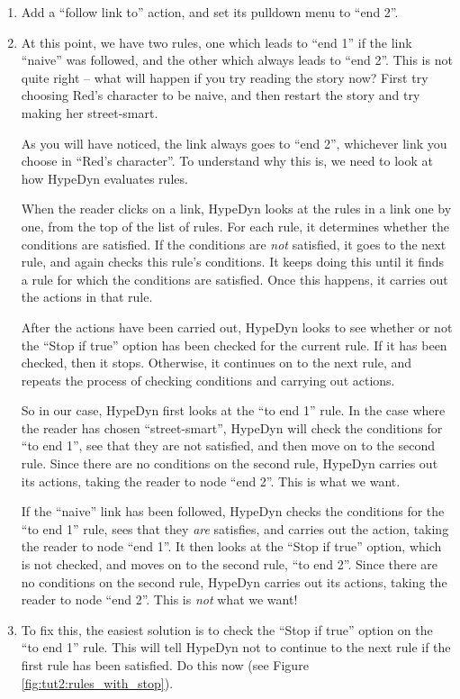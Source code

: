 \documentclass{article}
\begin{document}
\begin{enumerate}
\item Add a ``follow link to'' action, and set its pulldown menu to ``end 2''.

\item At this point, we have two rules, one which leads to ``end 1'' if the link ``naive'' was followed, and the other which always leads to ``end 2''. This is not quite right -- what will happen if you try reading the story now? First try choosing Red's character to be naive, and then restart the story and try making her street-smart.

As you will have noticed, the link always goes to ``end 2'', whichever link you choose in ``Red's character''. To understand why this is, we need to look at how HypeDyn evaluates rules.

When the reader clicks on a link, HypeDyn looks at the rules in a link one by one, from the top of the list of rules. For each rule, it determines whether the conditions are satisfied. If the conditions are \textit{not} satisfied, it goes to the next rule, and again checks this rule's conditions. It keeps doing this until it finds a rule for which the conditions are satisfied. Once this happens, it carries out the actions in that rule.

After the actions have been carried out, HypeDyn looks to see whether or not the ``Stop if true'' option has been checked for the current rule. If it has been checked, then it stops. Otherwise, it continues on to the next rule, and repeats the process of checking conditions and carrying out actions.

So in our case, HypeDyn first looks at the ``to end 1'' rule. In the case where the reader has chosen ``street-smart'', HypeDyn will check the conditions for ``to end 1'', see that they are not satisfied, and then move on to the second rule. Since there are no conditions on the second rule, HypeDyn carries out its actions, taking the reader to node ``end 2''. This is what we want.

If the ``naive'' link has been followed, HypeDyn checks the conditions for the ``to end 1'' rule, sees that they \textit{are} satisfies, and carries out the action, taking the reader to node ``end 1''. It then looks at the ``Stop if true'' option, which is not checked, and moves on to the second rule, ``to end 2''. Since there are no conditions on the second rule, HypeDyn carries out its actions, taking the reader to node ``end 2''. This is \textit{not} what we want!

\item To fix this, the easiest solution is to check the ``Stop if true'' option on the ``to end 1'' rule. This will tell HypeDyn not to continue to the next rule if the first rule has been satisfied. Do this now (see Figure \ref{fig:tut2:rules_with_stop}).


\end{enumerate}
\end{document}
